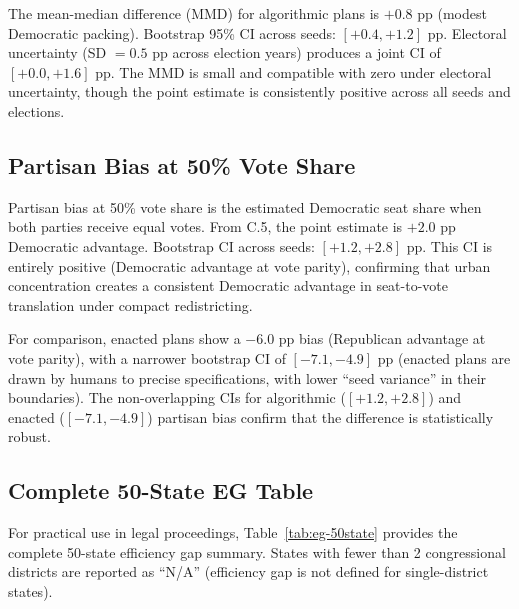 The mean-median difference (MMD) for algorithmic plans is $+0.8$ pp
(modest Democratic packing). Bootstrap 95\% CI across seeds:
$[+0.4, +1.2]$ pp. Electoral uncertainty (SD $= 0.5$ pp across election
years) produces a joint CI of $[+0.0, +1.6]$ pp. The MMD is small and
compatible with zero under electoral uncertainty, though the point
estimate is consistently positive across all seeds and elections.

\subsection{Partisan Bias at 50\% Vote Share}

Partisan bias at 50\% vote share is the estimated Democratic seat
share when both parties receive equal votes. From C.5, the point
estimate is $+2.0$ pp Democratic advantage. Bootstrap CI across seeds:
$[+1.2, +2.8]$ pp. This CI is entirely positive (Democratic advantage
at vote parity), confirming that urban concentration creates a
consistent Democratic advantage in seat-to-vote translation under
compact redistricting.

For comparison, enacted plans show a $-6.0$ pp bias (Republican
advantage at vote parity), with a narrower bootstrap CI of
$[-7.1, -4.9]$ pp (enacted plans are drawn by humans to precise
specifications, with lower ``seed variance'' in their boundaries).
The non-overlapping CIs for algorithmic ($[+1.2, +2.8]$) and enacted
($[-7.1, -4.9]$) partisan bias confirm that the difference is
statistically robust.

\subsection{Complete 50-State EG Table}

For practical use in legal proceedings, Table~\ref{tab:eg-50state}
provides the complete 50-state efficiency gap summary. States with
fewer than 2 congressional districts are reported as ``N/A'' (efficiency
gap is not defined for single-district states).

